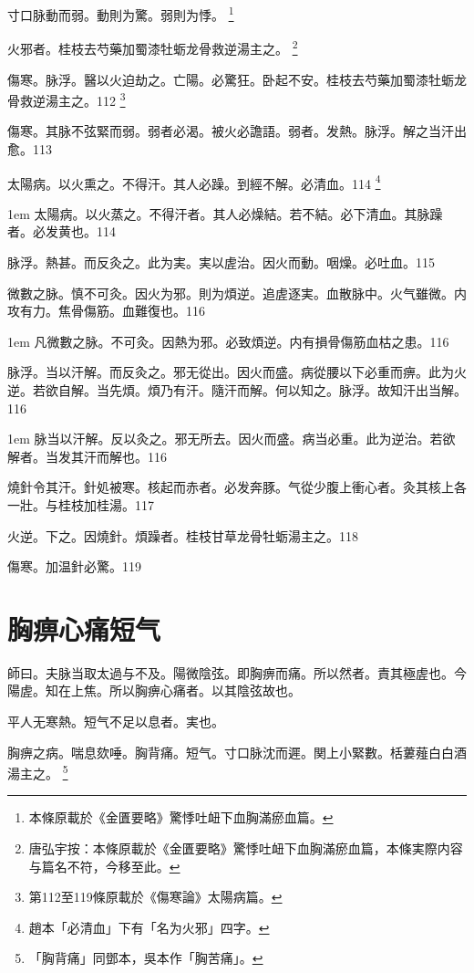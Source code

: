 寸口脉動而弱。動則为驚。弱則为悸。
	\footnote{
		本條原載於《金匱要略》驚悸吐衄下血胸滿瘀血篇。
	}

火邪者。桂枝去芍藥加蜀漆牡蛎龙骨救逆湯主之。
	\footnote{
		唐弘宇按：本條原載於《金匱要略》驚悸吐衄下血胸滿瘀血篇，本條実際内容与篇名不符，今移至此。
	}

傷寒。脉浮。醫以火迫劫之。亡陽。{\khaai 必}驚狂。卧起不安。桂枝去芍藥加蜀漆牡蛎龙骨救逆湯主之。112
	\footnote{
		第112至119條原載於《傷寒論》太陽病篇。
	}

傷寒。其脉不弦緊而弱{\khaai 。弱}者必渴。被火必譫語。{\khaai 弱者。发熱。脉浮。解之当汗出愈。}113

太陽病。以火熏之。不得汗。其人必躁。到經不解。必清血。114
	\footnote{
		趙本「必清血」下有「名为火邪」四字。
	}
	
\hangindent 1em
太陽病。以火蒸之。不得汗者。其人必燥結。若不結。必下清血。其脉躁者。必发黄也。{\shenghui}114

脉浮。熱甚。而反灸之。此为実。実以虗治。因火而動。咽燥。必吐血。115

微數之脉。慎不可灸。因火为邪。則为煩逆。追虗逐実。血散脉中。火气雖微。内攻有力。焦骨傷筋。血難復也。116

\hangindent 1em
凡微數之脉。不可灸。因熱为邪。必致煩逆。内有損骨傷筋血枯之患。{\shenghui}116

脉浮。当以汗解。而反灸之。邪无從出。因火而盛。病從腰以下必重而痹。此为火逆。若欲自解。当先煩。煩乃有汗。隨汗而解。何以知之。脉浮。故知汗出当解。116

\hangindent 1em
脉当以汗解。反以灸之。邪无所去。因火而盛。病当必重。此为逆治。若欲解者。当发其汗而解也。{\shenghui}116

燒針令其汗。針処被寒。核起而赤者。必发奔豚。气從少腹上衝心者。灸其核上各一壯。与桂枝加桂湯。117

火逆。下之。因燒針。煩躁者。桂枝甘草龙骨牡蛎湯主之。118

傷寒。加温針必驚。119

\chapter{胸痹心痛短气}

師曰。夫脉当取太過与不及。陽微陰弦。即胸痹而痛。所以然者。責其極虗也。今陽虗。知在上焦。所以胸痹心痛者。以其陰弦故也。

平人无寒熱。短气不足以息者。実也。

胸痹之病。喘息欬唾。胸背痛。短气。寸口脉沈而遲。関上小緊數。栝蔞薤白白酒湯主之。
	\footnote{
		「胸背痛」同鄧本，吳本作「胸苦痛」。
	}

